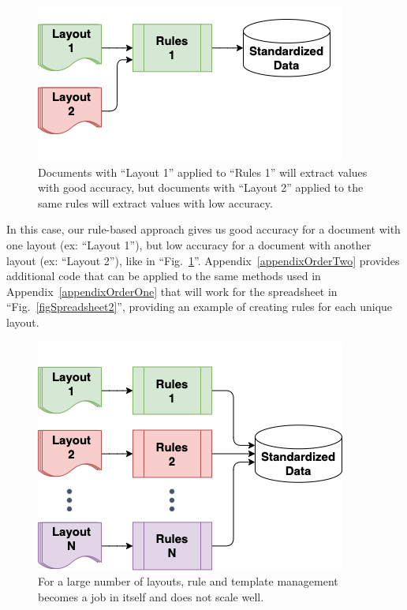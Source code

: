 \documentclass[conference]{IEEEtran}
\begin{document}
\begin{figure}[ht]
\centerline{\includegraphics[width=\columnwidth]{RulesFlow2a.png}}
\caption{Documents with ``Layout 1'' applied to ``Rules 1'' will extract values with good accuracy, but documents with ``Layout 2'' applied to the same rules will extract values with low accuracy.}
\label{figRulesFlow2a}
\end{figure}

In this case, our rule-based approach gives us good accuracy for a document with one layout (ex: ``Layout 1''), but low accuracy for a document with another layout (ex: ``Layout 2''), like in ``Fig.~\ref{figRulesFlow2a}''. Appendix~\ref{appendixOrderTwo} provides additional code that can be applied to the same methods used in Appendix~\ref{appendixOrderOne} that will work for the spreadsheet in ``Fig.~\ref{figSpreadsheet2}'', providing an example of creating rules for each unique layout.

\begin{figure}[ht]
\centerline{\includegraphics[width=\columnwidth]{RulesFlowN.png}}
\caption{For a large number of layouts, rule and template management becomes a job in itself and does not scale well.}
\label{figRulesFlow3}
\end{figure}
\end{document}

